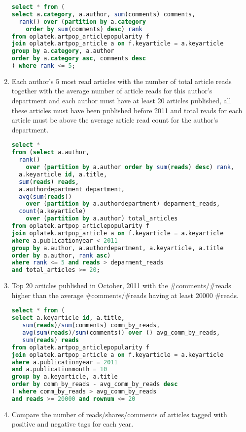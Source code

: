 \begin{enumerate}
\begin{lstlisting}[language=sql]
select * from (
select a.category, a.author, sum(comments) comments, 
  rank() over (partition by a.category 
    order by sum(comments) desc) rank 
from oplatek.artpop_articlepopularity f
join oplatek.artpop_article a on f.keyarticle = a.keyarticle
group by a.category, a.author
order by a.category asc, comments desc
) where rank <= 5;
\end{lstlisting}
\item    Each author's 5 most read articles with the number of total article reads together with the average number of article reads for this author's department and each author must have at least 20 articles published, all these articles must have been published before 2011 and total reads for each article must be above the average article read count for the author's department.
\begin{lstlisting}[language=sql] 
select *
from (select a.author, 
  rank() 
    over (partition by a.author order by sum(reads) desc) rank,
  a.keyarticle id, a.title,
  sum(reads) reads, 
  a.authordepartment department,
  avg(sum(reads)) 
    over (partition by a.authordepartment) deparment_reads,
  count(a.keyarticle) 
    over (partition by a.author) total_articles
from oplatek.artpop_articlepopularity f
join oplatek.artpop_article a on f.keyarticle = a.keyarticle
where a.publicationyear < 2011
group by a.author, a.authordepartment, a.keyarticle, a.title
order by a.author, rank asc)
where rank <= 5 and reads > deparment_reads 
and total_articles >= 20;
\end{lstlisting}
\item    Top 20 articles published in October, 2011 with the \#comments/\#reads higher than the average \#comments/\#reads having at least 20000 \#reads.
\begin{lstlisting}[language=sql] 
select * from (
select a.keyarticle id, a.title,
   sum(reads)/sum(comments) comm_by_reads,
   avg(sum(reads)/sum(comments)) over () avg_comm_by_reads,
   sum(reads) reads
from oplatek.artpop_articlepopularity f
join oplatek.artpop_article a on f.keyarticle = a.keyarticle
where a.publicationyear = 2011 
and a.publicationmonth = 10
group by a.keyarticle, a.title
order by comm_by_reads - avg_comm_by_reads desc
) where comm_by_reads > avg_comm_by_reads 
and reads >= 20000 and rownum <= 20
\end{lstlisting}
\item    Compare the number of reads/shares/comments of articles tagged with positive and negative tags for each year.
\begin{lstlisting}[language=sql] 

\end{lstlisting}
\end{enumerate}
